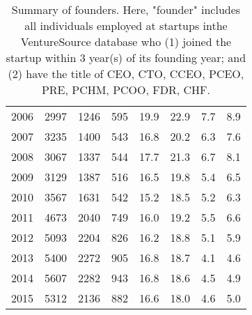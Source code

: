 \begin{table}[!htb]
\begin{tabular}{p{1.75cm}p{1.75cm}p{1.75cm}p{1.75cm}p{1.75cm}p{1.75cm}p{1.75cm}p{1.75cm}}
  2006 & 2997 & 1246 & 595 & 19.9 & 22.9 & 7.7 & 8.9 \\ 
  2007 & 3235 & 1400 & 543 & 16.8 & 20.2 & 6.3 & 7.6 \\ 
  2008 & 3067 & 1337 & 544 & 17.7 & 21.3 & 6.7 & 8.1 \\ 
  2009 & 3129 & 1387 & 516 & 16.5 & 19.8 & 5.4 & 6.5 \\ 
  2010 & 3567 & 1631 & 542 & 15.2 & 18.5 & 5.2 & 6.3 \\ 
  2011 & 4673 & 2040 & 749 & 16.0 & 19.2 & 5.5 & 6.6 \\ 
  2012 & 5093 & 2204 & 826 & 16.2 & 18.8 & 5.1 & 5.9 \\ 
  2013 & 5400 & 2272 & 905 & 16.8 & 18.7 & 4.1 & 4.6 \\ 
  2014 & 5607 & 2282 & 943 & 16.8 & 18.6 & 4.5 & 4.9 \\ 
  2015 & 5312 & 2136 & 882 & 16.6 & 18.0 & 4.6 & 5.0 \\ 
   \bottomrule
\end{tabular}
\endgroup
\caption{Summary of founders. Here, "founder" includes all individuals employed at startups inthe VentureSource database who (1) joined the startup within 3 year(s) of its founding year; and (2) have the title of CEO, CTO, CCEO, PCEO, PRE, PCHM, PCOO, FDR, CHF.} 
\label{table:GStable_founder2}
\end{table}
